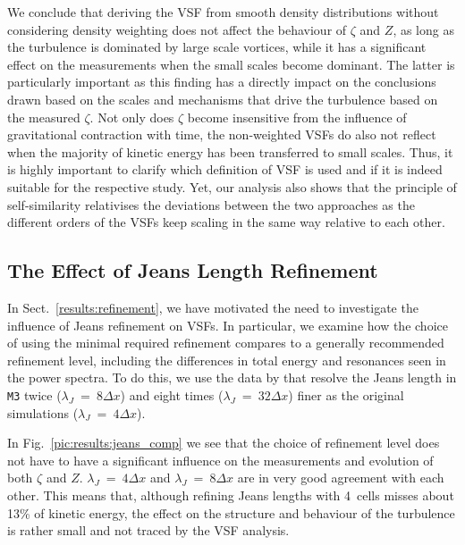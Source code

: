 We conclude that deriving the VSF from smooth density distributions without considering density weighting does not affect the behaviour of $\zeta$ and $Z$, as long as the turbulence is dominated by large scale vortices, while it has a significant effect on the measurements when the small scales become dominant.
The latter is particularly important as this finding has a directly impact on the conclusions drawn based on the scales and mechanisms that drive the turbulence based on the measured $\zeta$.
Not only does $\zeta$ become insensitive from the influence of gravitational contraction with time, the non-weighted VSFs do also not reflect when the majority of kinetic energy has been transferred to small scales. 
Thus, it is highly important to clarify which definition of VSF is used and if it is indeed suitable for the respective study.
Yet, our analysis also shows that the principle of self-similarity relativises the deviations between the two approaches as the different orders of the VSFs keep scaling in the same way relative to each other. 




\subsection{The Effect of Jeans Length Refinement}\label{discussion:refinement}

In Sect.~\ref{results:refinement}, we have motivated the need to investigate the influence of Jeans refinement on VSFs.
In particular, we examine how the choice of using the minimal required refinement compares to a generally recommended refinement level, including the differences in total energy and resonances seen in the power spectra. 
To do this, we use the data by  that resolve the Jeans length in \texttt{M3} twice ($\lambda_J$~=~$8\Delta{}x$) and eight times ($\lambda_J$~=~$32\Delta{}x$) finer as the original simulations ($\lambda_J$~=~$4\Delta{}x$).

In Fig.~\ref{pic:results:jeans_comp} we see that the choice of refinement level does not have to have a significant influence on the measurements and evolution of both $\zeta$ and $Z$. 
$\lambda_J$~=~$4\Delta{}x$ and $\lambda_J$~=~$8\Delta{}x$ are in very good agreement with each other.
This means that, although refining Jeans lengths with 4~cells misses about 13\% of kinetic energy, the effect on the structure and behaviour of the turbulence is rather small and not traced by the VSF analysis.

